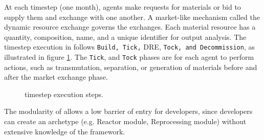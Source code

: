 At each timestep (one month),
agents make requests for materials or bid to supply them and exchange
with one another. A market-like mechanism called the dynamic resource exchange
\cite{gidden_agent-based_2015} governs the exchanges.
Each material resource has a quantity, composition, name, and a unique identifier
for output analysis. The timestep execution in \Cyclus follows 
\texttt{Build, Tick,} \gls{DRE}, \texttt{Tock, and Decommission}, as illustrated in
figure \ref{fig:time}. The \texttt{Tick}, and \texttt{Tock} phases are for
each agent to perform actions, such as transmutation, separation, or generation
of materials before and after the market exchange phase.

\begin{figure}[h]
\centering
{}
\caption{\Cyclus timestep execution steps.}
\label{fig:time}
\end{figure}

The modularity of \Cyclus allows a low barrier of
entry for developers, since developers can create an
archetype (e.g. Reactor module, Reprocessing module)
without extensive knowledge of the \Cyclus framework.
